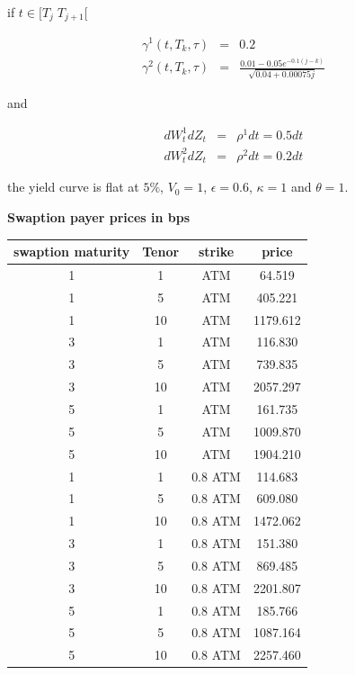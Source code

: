 \documentclass[10pt,a4paper,english,landscape]{slides}
\newcommand{\ban}{\begin{eqnarray*}}
\newcommand{\ean}{\end{eqnarray*}}
\begin{document}
if $t\in [T_j \; T_{j+1}[$ 

\ban
\gamma^1(t,T_k,\tau)&=&0.2\\
\gamma^2(t,T_k,\tau)&=& \frac{0.01-0.05e^{-0.1(j-k)}}{\sqrt{0.04+0.00075j}}
\ean

and 

\ban
dW^1_tdZ_t&=&\rho^1dt=0.5 dt\\
dW^2_tdZ_t&=&\rho^2dt=0.2 dt
\ean

the yield curve is flat at $5\%$, $V_0=1$, $\epsilon=0.6$, $\kappa=1$ and $\theta=1$.
\begin{center}
{\bf Swaption payer prices in bps}\\
\begin{tabular}{|cccc|}\hline
{\small swaption maturity}  & Tenor     & strike      &   price   \\ \hline
  1      &  1    &    ATM   &  64.519   \\  
  1      &  5    &    ATM   &  405.221    \\
  1      &  10   &    ATM   &  1179.612    \\
  3      &  1    &    ATM   &  116.830   \\  
  3      &  5    &    ATM   &  739.835    \\
  3      &  10   &    ATM   &  2057.297     \\
  5      &  1    &    ATM   &   161.735  \\  
  5      &  5    &    ATM   &   1009.870 \\
  5      &  10   &    ATM   &   1904.210  \\ \hline
  1      &  1    &    0.8 ATM   &   114.683  \\  
  1      &  5    &    0.8 ATM   &    609.080 \\
  1      &  10   &    0.8 ATM   &    1472.062  \\
  3      &  1    &    0.8 ATM   &    151.380 \\  
  3      &  5    &    0.8 ATM   &    869.485 \\
  3      &  10   &    0.8 ATM   &    2201.807  \\
  5      &  1    &    0.8 ATM   &    185.766 \\  
  5      &  5    &    0.8 ATM   &    1087.164 \\
  5      &  10   &    0.8 ATM   &    2257.460  \\ \hline
\end{tabular} 
\end{center} 
\end{document}
